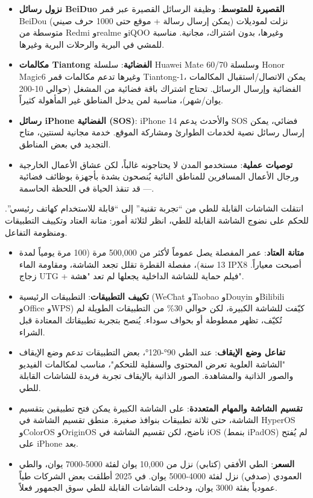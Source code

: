 \begin{itemize}
  \item \textbf{نزول رسائل BeiDuo القصيرة للمتوسط}: وظيفة الرسائل القصيرة عبر قمر BeiDou (يمكن إرسال رسالة + موقع حتى 1000 حرف صيني) نزلت لموديلات متوسطة من Redmi وrealme وiQOO وغيرها، بدون اشتراك، مجانية. مناسبة للمشي في البرية والرحلات البرية وغيرها.
  \item \textbf{مكالمات Tiantong الفضائية}: سلسلة Huawei Mate 60/70 وسلسلة Honor Magic6 وغيرها تدعم مكالمات قمر Tiantong-1، يمكن الاتصال/استقبال المكالمات الفضائية وإرسال الرسائل. تحتاج اشتراك باقة فضائية من المشغل (حوالي 10-200 يوان/شهر)، مناسبة لمن يدخل المناطق غير المأهولة كثيراً.
  \item \textbf{رسائل iPhone الفضائية (SOS)}: iPhone 14 والأحدث يدعم SOS فضائي، يمكن إرسال رسائل نصية لخدمات الطوارئ ومشاركة الموقع. خدمة مجانية لسنتين، متاح التجديد في بعض المناطق.
  \item \textbf{توصيات عملية}: مستخدمو المدن لا يحتاجونه غالباً، لكن عشاق الأعمال الخارجية ورجال الأعمال المسافرين للمناطق النائية يُنصحون بشدة بأجهزة بوظائف فضائية — قد تنقذ الحياة في اللحظة الحاسمة.
\end{itemize}


انتقلت الشاشات القابلة للطي من “تجربة تقنية” إلى “قابلة للاستخدام كهاتف رئيسي”. للحكم على نضوج الشاشة القابلة للطي، انظر لثلاثة أمور: متانة العتاد وتكييف التطبيقات ومنظومة التفاعل.

\begin{itemize}
  \item \textbf{متانة العتاد}: عمر المفصلة يصل عموماً لأكثر من 500,000 مرة (100 مرة يومياً لمدة 13 سنة)، مفصلة القطرة تقلل تجعد الشاشة، ومقاومة الماء IPX8 أصبحت معياراً. زجاج UTG + فيلم حماية للشاشة الداخلية يجعلها لم تعد "هشة".
  \item \textbf{تكييف التطبيقات}: التطبيقات الرئيسية (WeChat وTaobao وDouyin وBilibili وOffice وWPS) كيّفت للشاشة الكبيرة، لكن حوالي 30\% من التطبيقات الطويلة لم تُكيّف، تظهر ممطوطة أو بحواف سوداء. يُنصح بتجربة تطبيقاتك المعتادة قبل الشراء.
  \item \textbf{تفاعل وضع الإيقاف}: عند الطي 90°-120°، بعض التطبيقات تدعم وضع الإيقاف "الشاشة العلوية تعرض المحتوى والسفلية للتحكم"، مناسب لمكالمات الفيديو والصور الذاتية والمشاهدة. الصور الذاتية بالإيقاف تجربة فريدة للشاشات القابلة للطي.
  \item \textbf{تقسيم الشاشة والمهام المتعددة}: على الشاشة الكبيرة يمكن فتح تطبيقين بتقسيم الشاشة، حتى ثلاثة تطبيقات بنوافذ صغيرة. منطق تقسيم الشاشة في HyperOS وColorOS وOriginOS ناضج، لكن تقسيم الشاشة في iOS (بنمط iPadOS) لم يُفتح على iPhone بعد.
  \item \textbf{السعر}: الطي الأفقي (كتابي) نزل من 10,000 يوان لفئة 5000-7000 يوان، والطي العمودي (صدفي) نزل لفئة 4000-5000 يوان. في 2025 أطلقت بعض الشركات طياً عمودياً بفئة 3000 يوان، ودخلت الشاشات القابلة للطي سوق الجمهور فعلاً.
\end{itemize}

